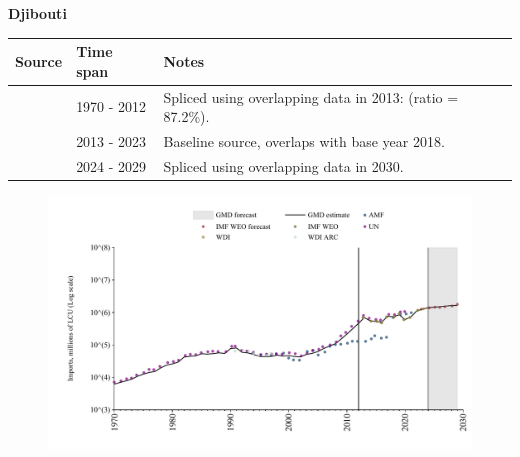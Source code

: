 \documentclass[12pt,a4paper,landscape]{article}
\begin{document}
\begin{adjustbox}{max totalsize={\paperwidth}{\paperheight},center}
\begin{minipage}[t][\textheight][t]{\textwidth}
\vspace*{0.5cm}
{}
\begin{center}
{\Large\bfseries Djibouti}
\end{center}
\vspace{0.5cm}
\begin{table}[H]
\centering
\small
\begin{tabular}{|l|l|l|}
\hline
\textbf{Source} & \textbf{Time span} & \textbf{Notes} \\
\hline
\rowcolor{white}\cite{UN}& 1970 - 2012 &Spliced using overlapping data in 2013: (ratio = 87.2\%).\\
\rowcolor{lightgray}\cite{WDI}& 2013 - 2023 &Baseline source, overlaps with base year 2018.\\
\rowcolor{white}\cite{IMF_WEO_forecast}& 2024 - 2029 &Spliced using overlapping data in 2030.\\
\hline
\end{tabular}
\end{table}
\begin{figure}[H]
\centering
\includegraphics[width=\textwidth,height=0.6\textheight,keepaspectratio]{graphs/DJI_imports.pdf}
\end{figure}
\end{minipage}
\end{adjustbox}
\end{document}
